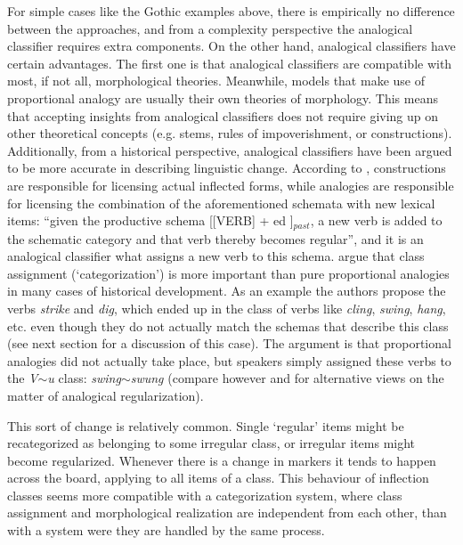 For simple cases like the Gothic examples above, there is empirically no difference between the approaches, and from a complexity perspective the analogical classifier requires extra components. On the other hand, analogical classifiers have certain advantages. The first one is that analogical classifiers are compatible with most, if not all, morphological theories. Meanwhile, models that make use of proportional analogy are usually their own theories of morphology. This means that accepting insights from analogical classifiers does not require giving up on other theoretical concepts (e.g. stems, rules of impoverishment, or constructions). Additionally, from a historical perspective, analogical classifiers have been argued to be more accurate in describing linguistic change. According to \textcite[p. 506]{Bybee.2015}, constructions are responsible for licensing actual inflected forms, while analogies are responsible for licensing the combination of the aforementioned schemata with new lexical items: ``given the productive schema [[VERB] + ed ]$_{past}$, a new verb is added to the schematic category and that verb thereby becomes regular'', and it is an analogical classifier what assigns a new verb to this schema. \textcite{Bybee.2015} argue that class assignment (`categorization') is more important than pure proportional analogies in many cases of historical development. As an example the authors propose the verbs \textit{strike} and \textit{dig}, which ended up in the class of verbs like \textit{cling}, \textit{swing}, \textit{hang}, etc. even though they do not actually match the schemas that describe this class (see next section for a discussion of this case). The argument is that proportional analogies did not actually take place, but speakers simply assigned these verbs to the \textit{V$\sim$u} class: \textit{swing}$\sim$\textit{swung} (compare however \textcite{DeSmet.2016} and \textcite{Fertig.2013} for alternative views on the matter of analogical regularization).

This sort of change is relatively common. Single `regular' items might be recategorized as belonging to some irregular class, or irregular items might become regularized. Whenever there is a change in markers it tends to happen across the board, applying to all items of a class. This behaviour of inflection classes seems more compatible with a categorization system, where class assignment and morphological realization are independent from each other, than with a system were they are handled by the same process.


